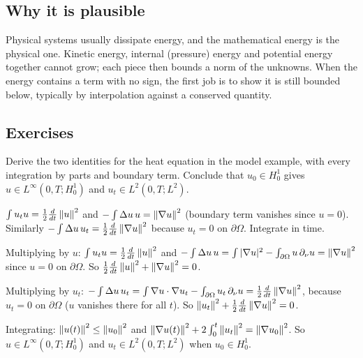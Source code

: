 \subsection*{Why it is plausible}

Physical systems usually dissipate energy, and the mathematical energy is the physical one. Kinetic energy, internal (pressure) energy and potential energy together cannot grow; each piece then bounds a norm of the unknowns. When the energy contains a term with no sign, the first job is to show it is still bounded below, typically by interpolation against a conserved quantity.

\subsection*{Exercises}

\begin{exercise}
  Derive the two identities for the heat equation in the model example, with every integration by parts and boundary term. Conclude that $u_0 \in H^1_0$ gives $u \in L^\infty(0,T;H^1_0)$ and $u_t \in L^2(0,T;L^2)$.
  \begin{hint}
    $\int u_t u = \frac12\frac{d}{dt}\left\lVert u\right\rVert^2$ and $-\int\Delta u\,u = \left\lVert \nabla u\right\rVert^2$ (boundary term vanishes since $u = 0$). Similarly $-\int\Delta u\,u_t = \frac12\frac{d}{dt}\left\lVert \nabla u\right\rVert^2$ because $u_t = 0$ on $\partial\Omega$. Integrate in time.
  \end{hint}
  \begin{solution}
    Multiplying by $u$: $\int u_tu = \frac12\frac{d}{dt}\left\lVert u\right\rVert^2$ and $-\int\Delta u\,u = \int|\nabla u|^2 - \int_{\partial\Omega}u\,\partial_\nu u = \left\lVert \nabla u\right\rVert^2$ since $u = 0$ on $\partial\Omega$. So $\frac12\frac{d}{dt}\left\lVert u\right\rVert^2 + \left\lVert \nabla u\right\rVert^2 = 0$.

    Multiplying by $u_t$: $-\int\Delta u\,u_t = \int\nabla u\cdot\nabla u_t - \int_{\partial\Omega}u_t\,\partial_\nu u = \frac12\frac{d}{dt}\left\lVert \nabla u\right\rVert^2$, because $u_t = 0$ on $\partial\Omega$ ($u$ vanishes there for all $t$). So $\left\lVert u_t\right\rVert^2 + \frac12\frac{d}{dt}\left\lVert \nabla u\right\rVert^2 = 0$.

    Integrating: $\left\lVert u(t)\right\rVert^2 \le \left\lVert u_0\right\rVert^2$ and $\left\lVert \nabla u(t)\right\rVert^2 + 2\int_0^t\left\lVert u_t\right\rVert^2 = \left\lVert \nabla u_0\right\rVert^2$. So $u \in L^\infty(0,T;H^1_0)$ and $u_t \in L^2(0,T;L^2)$ when $u_0 \in H^1_0$.
  \end{solution}
\end{exercise}

